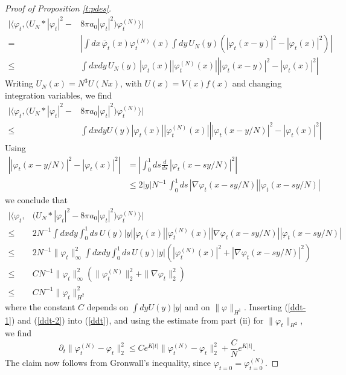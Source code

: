 \documentclass[11pt,a4paper]{article}
\begin{document}
\begin{proof}[Proof of Proposition \ref{t:pdes}]
\[ \begin{split}  \Big| \Big\langle \varphi_t, \big(U_N * |\varphi_t|^2 -& 8 \pi a_0
      |\varphi_t|^2\big) \varphi_t^{(N)} \Big\rangle \Big|  \\ = \; & \left| \int dx \, \overline{\varphi}_t (x) \varphi_t^{(N)} (x) \int dy \, U_N (y) \left( |\varphi_t (x-y)|^2 - |\varphi_t (x)|^2\right) \right|   \\ \leq 
      \; & \int dx dy \, U_N (y) \, |\varphi_t (x)| |\varphi_t^{(N)} (x)| \left| |\varphi_t (x-y)|^2 - |\varphi_t (x)|^2 \right| 
  \end{split} \]    
Writing $U_N (x) = N^3 U (Nx)$, with $U (x) = V(x) f(x)$ and changing integration variables, we find
\[ \begin{split}
      \Big| \Big\langle \varphi_t, \big(U_N * |\varphi_t|^2 -& 8 \pi a_0
      |\varphi_t|^2\big) \varphi_t^{(N)} \Big\rangle \Big| \\ \leq \; &\int dx dy U (y) |\varphi_t (x)| |\varphi_t^{(N)} (x)| \left| |\varphi_t (x-y/N)|^2 - |\varphi_t (x)|^2 \right|  
  \end{split} \]
Using
\[ \begin{split} \left| |\varphi_t (x-y/N)|^2 - |\varphi_t (x)|^2 \right|  & = \left| \int_0^1 ds \frac{d}{ds} \, |\varphi_t (x-sy/N)|^2 \right| \\ &\leq 2 |y| N^{-1}\, \int_0^1ds \, |\nabla \varphi_t (x-sy/N)| |\varphi_t (x-sy/N)| \end{split} \]
we conclude that
\begin{equation}\label{ddt-1} \begin{split}
      \Big| \Big\langle \varphi_t, &\big(U_N * |\varphi_t|^2 - 8 \pi a_0
      |\varphi_t|^2\big) \varphi_t^{(N)} \Big\rangle \Big| \\ \leq\; &
   2 N^{-1}   \int dx dy \int_0^1 ds \, U (y) |y| |\varphi_t (x)| |\varphi_t^{(N)} (x)| |\nabla \varphi_t (x-sy/N)| |\varphi_t (x-sy/N)| \\ \leq \; & 2 N^{-1} \| \varphi_t \|^2_\infty \int dx dy \int_0^1 ds \, U(y) |y| \left( |\varphi_t^{(N)} (x)|^2 +  |\nabla \varphi_t (x-sy/N)|^2 \right) \\ \leq \; & CN^{-1} \| \varphi_t \|_\infty^2 \left( \| \varphi_t^{(N)} \|_2^2 + \| \nabla \varphi_t \|_2^2 \right)  \\ \leq \; & CN^{-1} \| \varphi_t \|_{H^2}^2 \end{split} \end{equation}
where the constant $C$ depends on $\int dy U(y) |y|$ and on $\| \varphi \|_{H^1}$. Inserting (\ref{ddt-1}) and (\ref{ddt-2}) into (\ref{ddt}), and using the estimate from part (ii) for $\| \varphi_t \|_{H^2}$, we find
\[\partial_t \| \varphi_t^{(N)} - \varphi_t \|_{2}^2 \le C e^{K|t|} \| \varphi_t^{(N)} - \varphi_t \|_{2}^2 + \frac{C}{N} e^{K|t|}.\]
The claim now follows from Gronwall's inequality, since $\varphi_{t=0} = \varphi^{(N)}_{t=0}$. 
\end{proof}
\end{document}
